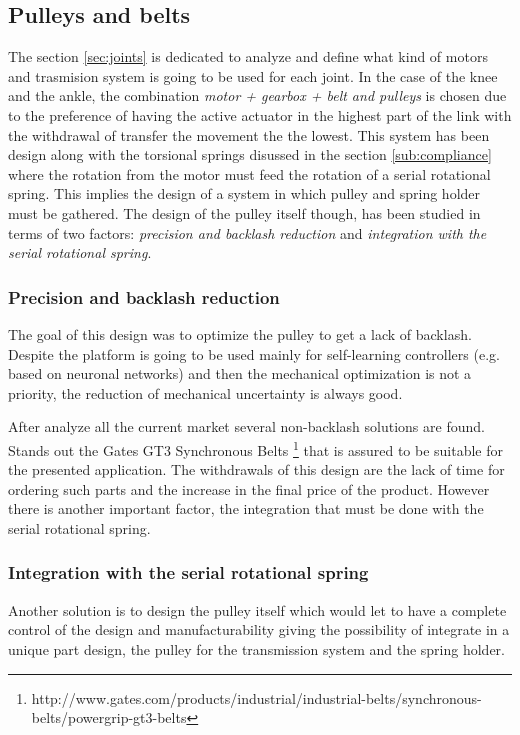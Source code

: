 \subsection{Pulleys and belts} %
\label{sub:pulleys_and_belts}
The section \ref{sec:joints} is dedicated to analyze and define what kind of motors and trasmision system is going to be used for each joint.
In the case of the knee and the ankle, the combination \textit{motor + gearbox + belt and pulleys} is chosen due to the preference of having the active actuator in the highest part of the link with the withdrawal of transfer the movement the the lowest.
This system has been design along with the torsional springs disussed in the section \ref{sub:compliance} where the rotation from the motor must feed the rotation of a serial rotational spring.
This implies the design of a system in which pulley and spring holder must be gathered.
The design of the pulley itself though, has been studied in terms of two factors: \textit{precision and backlash reduction} and \textit{integration with the serial rotational spring}.

\subsubsection{Precision and backlash reduction} %
\label{ssub:precision_and_backlash_reduction}
The goal of this design was to optimize the pulley to get a lack of backlash.
Despite the platform is going to be used mainly for self-learning controllers (e.g. based on neuronal networks) and then the mechanical optimization is not a priority, the reduction of mechanical uncertainty is always good.

After analyze all the current market several non-backlash solutions are found.
Stands out the Gates GT3 Synchronous Belts \footnote{http://www.gates.com/products/industrial/industrial-belts/synchronous-belts/powergrip-gt3-belts} that is assured to be suitable for the presented application.
The withdrawals of this design are the lack of time for ordering such parts and the increase in the final price of the product. 
However there is another important factor, the integration that must be done with the serial rotational spring.

\subsubsection{Integration with the serial rotational spring} %
\label{ssub:integration_with_the_serial_rotational}
Another solution is to design the pulley itself which would let to have a complete control of the design and manufacturability giving the possibility of integrate in a unique part design, the pulley for the transmission system and the spring holder.

